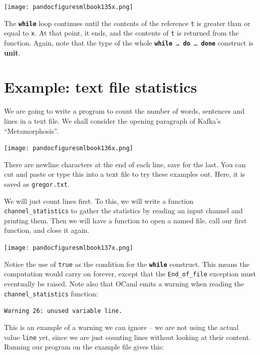 \documentclass[]{book}
\newcommand{\smspace}{\vspace{4mm}}
\begin{document}
\medskip
\begin{center}
\noindent\texttt{[image: pandocfiguresmlbook135x.png]}
\end{center}
\medskip

\noindent The \textbf{\texttt{while}} loop continues until the contents of the reference \texttt{t} is greater than or equal to \texttt{x}. At that point, it ends, and the contents of \texttt{t} is returned from the function. Again, note that the type of the whole \textbf{\texttt{while}}\texttt{ \ldots\ }\textbf{\texttt{do}}\texttt{ \ldots\ }\textbf{\texttt{done}}   construct is \textbf{\textsf{unit}}.

\section*{Example: text file statistics}

We are going to write a program to count the number of words, sentences and lines in a text file. We shall consider the opening paragraph of Kafka's ``Metamorphosis''.

\medskip
\begin{center}
\noindent\texttt{[image: pandocfiguresmlbook136x.png]}
\end{center}
\medskip

\noindent There are newline characters at the end of each line, save for the last. You can cut and paste or type this into a text file to try these examples out. Here, it is saved as \texttt{gregor.txt}.

We will just count lines first. To this, we will write a function \texttt{channel\_statistics} to gather the statistics by reading an input channel and printing them. Then we will have a function to open a named file, call our first function, and close it again.

\medskip
\begin{center}
\noindent\texttt{[image: pandocfiguresmlbook137x.png]}
\end{center}
\medskip

\noindent Notice the use of \texttt{true} as the condition for the \textbf{\texttt{while}} construct. This means the computation would carry on forever, except that the \texttt{End\_of\_file} exception must eventually be raised. Note also that OCaml emits  a warning when reading the \texttt{channel\_statistics} function:

\smspace
\texttt{Warning 26:\ unused variable line.}
\smspace

\noindent This is an example of a warning we can ignore -- we are not using the actual value \texttt{line} yet, since we are just counting lines without looking at their content. Running our program on the example file gives this:
\end{document}
